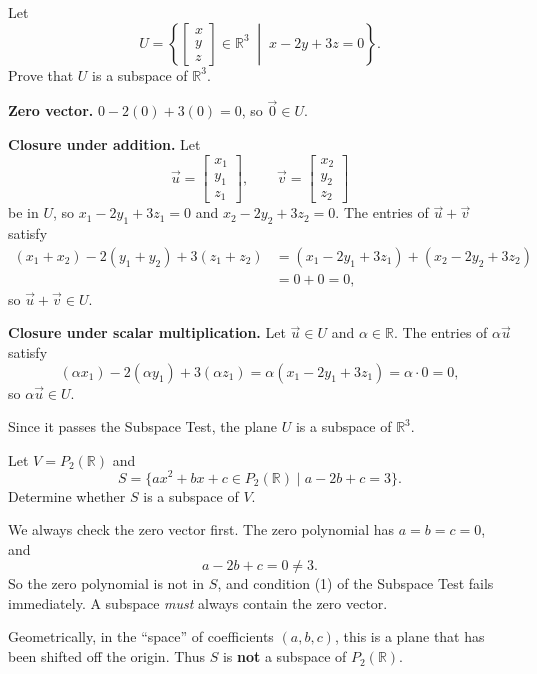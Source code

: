 \begin{example}
Let
\[
U = \left\{ \begin{bmatrix} x \\ y \\ z \end{bmatrix} \in \mathbb{R}^3 \;\middle|\; x - 2y + 3z = 0 \right\}.
\]
Prove that $U$ is a subspace of $\mathbb{R}^3$.

\begin{solution}
\textbf{Zero vector.} $0 - 2(0) + 3(0) = 0$, so $\vec{0} \in U$.

\medskip
\textbf{Closure under addition.} Let
\[
\vec{u} = \begin{bmatrix} x_1 \\ y_1 \\ z_1 \end{bmatrix}, \qquad
\vec{v} = \begin{bmatrix} x_2 \\ y_2 \\ z_2 \end{bmatrix}
\]
be in $U$, so $x_1 - 2y_1 + 3z_1 = 0$ and $x_2 - 2y_2 + 3z_2 = 0$. The entries of $\vec{u} + \vec{v}$ satisfy
\begin{align*}
(x_1 + x_2) - 2(y_1 + y_2) + 3(z_1 + z_2)
&= (x_1 - 2y_1 + 3z_1) + (x_2 - 2y_2 + 3z_2) \\
&= 0 + 0 = 0,
\end{align*}
so $\vec{u} + \vec{v} \in U$.

\medskip
\textbf{Closure under scalar multiplication.} Let $\vec{u} \in U$ and $\alpha \in \mathbb{R}$. The entries of $\alpha\vec{u}$ satisfy
\[
(\alpha x_1) - 2(\alpha y_1) + 3(\alpha z_1) = \alpha(x_1 - 2y_1 + 3z_1) = \alpha \cdot 0 = 0,
\]
so $\alpha\vec{u} \in U$.

Since it passes the Subspace Test, the plane $U$ is a subspace of $\mathbb{R}^3$.
\end{solution}
\end{example}

\begin{example}
Let $V = P_2(\mathbb{R})$ and
\[
S = \{ ax^2 + bx + c \in P_2(\mathbb{R}) \mid a - 2b + c = 3 \}.
\]
Determine whether $S$ is a subspace of $V$.

\begin{solution}
We always check the zero vector first. The zero polynomial has $a = b = c = 0$, and
\[
a - 2b + c = 0 \neq 3.
\]
So the zero polynomial is not in $S$, and condition (1) of the Subspace Test fails immediately. A subspace \emph{must} always contain the zero vector.

Geometrically, in the ``space'' of coefficients $(a, b, c)$, this is a plane that has been shifted off the origin. Thus $S$ is \textbf{not} a subspace of $P_2(\mathbb{R})$.
\end{solution}
\end{example}

